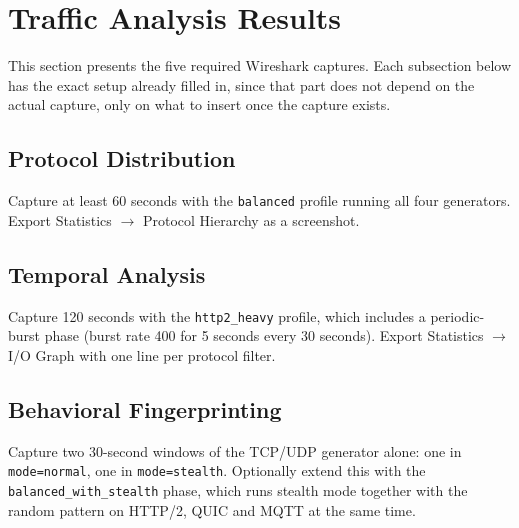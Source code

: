 \section{Traffic Analysis Results}

This section presents the five required Wireshark captures. Each subsection
below has the exact setup already filled in, since that part does not depend
on the actual capture, only on what to insert once the capture exists.

\subsection{Protocol Distribution}

Capture at least 60 seconds with the \texttt{balanced} profile running all
four generators. Export Statistics $\rightarrow$ Protocol Hierarchy as a
screenshot.


\subsection{Temporal Analysis}

Capture 120 seconds with the \texttt{http2\_heavy} profile, which includes a
periodic-burst phase (burst rate 400 for 5 seconds every 30 seconds). Export
Statistics $\rightarrow$ I/O Graph with one line per protocol filter.


\subsection{Behavioral Fingerprinting}

Capture two 30-second windows of the TCP/UDP generator alone: one in
\texttt{mode=normal}, one in \texttt{mode=stealth}. Optionally extend this with
the \texttt{balanced\_with\_stealth} phase, which runs stealth mode together
with the random pattern on HTTP/2, QUIC and MQTT at the same time.


